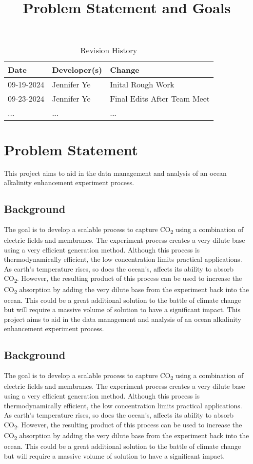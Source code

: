 \documentclass{article}
\title{Problem Statement and Goals\\\progname}
\author{\authname}
\date{}
\begin{document}
\maketitle

\begin{table}[hp]
\caption{Revision History} \label{TblRevisionHistory}
\begin{tabularx}{\textwidth}{llX}
\toprule
\textbf{Date} & \textbf{Developer(s)} & \textbf{Change}\\
\midrule
09-19-2024 & Jennifer Ye & Inital Rough Work \\
09-23-2024 & Jennifer Ye & Final Edits After Team Meet\\
... & ... & ...\\
\bottomrule
\end{tabularx}
\end{table}



\section{Problem Statement}
This project aims to aid in the data management and analysis of an ocean
alkalinity enhancement experiment process.

\subsection{Background}
The goal is to develop a scalable process to capture CO\textsubscript{2} using a
combination of electric fields and membranes. The experiment process creates a
very dilute base using a very efficient generation method. Although this process
is thermodynamically efficient, the low concentration limits practical
applications. As earth's temperature rises, so does the ocean's, affects its
ability to absorb CO\textsubscript{2}. However, the resulting product of this
process can be used to increase the CO\textsubscript{2} absorption by adding the
very dilute base from the experiment back into the ocean. This could be a great
additional solution to the battle of climate change but will require a massive
volume of solution to have a significant impact.
This project aims to aid in the data management and analysis of an ocean
alkalinity enhancement experiment process.

\subsection{Background}
The goal is to develop a scalable process to capture CO\textsubscript{2} using a
combination of electric fields and membranes. The experiment process creates a
very dilute base using a very efficient generation method. Although this process
is thermodynamically efficient, the low concentration limits practical
applications. As earth's temperature rises, so does the ocean's, affects its
ability to absorb CO\textsubscript{2}. However, the resulting product of this
process can be used to increase the CO\textsubscript{2} absorption by adding the
very dilute base from the experiment back into the ocean. This could be a great
additional solution to the battle of climate change but will require a massive
volume of solution to have a significant impact.
\end{document}
